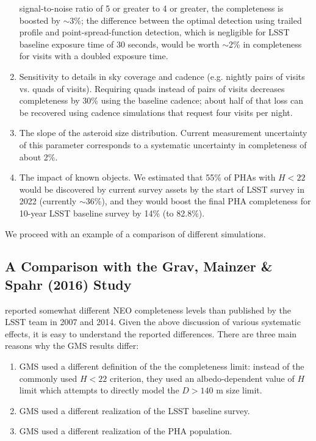 \begin{enumerate}
          signal-to-noise ratio of 5 or greater to 4 or greater, the completeness is boosted by $\sim$3\%;
          the difference between the optimal detection using trailed profile and point-spread-function
          detection, which is negligible for LSST baseline exposure time of 30 seconds, would be worth $\sim$2\%
          in completeness for visits with a doubled exposure time.
\item Sensitivity to details in sky coverage and cadence (e.g. nightly pairs of visits vs. quads of visits).
          Requiring quads instead of pairs of visits decreases completeness by 30\% using the baseline cadence;
          about half of that loss can be recovered using cadence simulations that request four visits per night.
\item The slope of the asteroid size distribution. Current measurement uncertainty of this parameter
          corresponds to a systematic uncertainty in completeness of about 2\%.
\item The impact of known objects. We estimated that 55\% of PHAs with $H<22$ would be discovered
          by current survey assets by the start of LSST survey in 2022 (currently $\sim$36\%), and they would
          boost the final PHA completeness for 10-year LSST baseline survey by 14\% (to 82.8\%).
\end{enumerate}

We proceed with an example of a comparison of different simulations.

\subsection{A Comparison with the Grav, Mainzer \& Spahr (2016) Study \label{sec:GMS}}

\citet*[][hereafter GMS]{GMS2016}
reported somewhat different NEO completeness levels than published by the LSST team
in 2007 and 2014. Given the above discussion of various systematic effects, it is easy to understand
the reported differences. There are three main reasons why the GMS results differ:
\begin{enumerate}
\item GMS used a different definition of the the completeness limit: instead of 
          the commonly used $H<22$ criterion, they used an albedo-dependent value 
          of $H$ limit which attempts to directly model the $D>140$ m size limit.
\item GMS used a different realization of the LSST baseline survey.
\item GMS used a different realization of the PHA population.
\end{enumerate}

